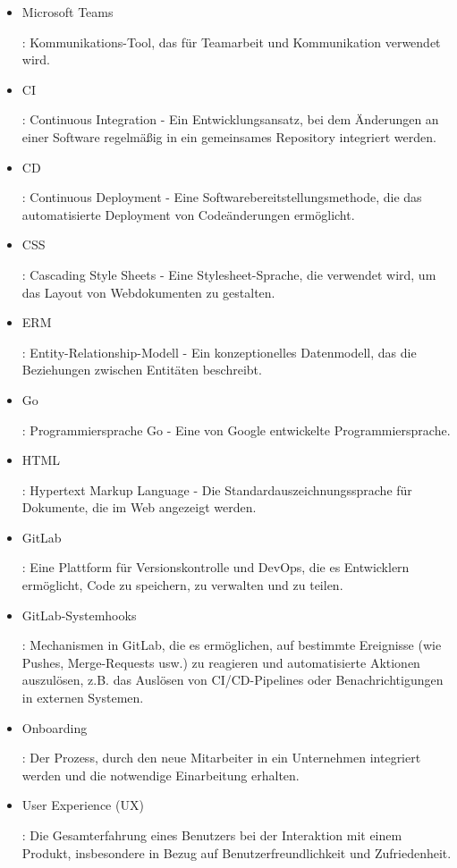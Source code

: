 

\begin{itemize}
    \item \hypertarget{MicrosoftTeams}{Microsoft Teams}: Kommunikations-Tool, das für Teamarbeit und Kommunikation verwendet wird.
    \item \hypertarget{CI}{CI}: Continuous Integration - Ein Entwicklungsansatz, bei dem Änderungen an einer Software regelmäßig in ein gemeinsames Repository integriert werden.
    \item \hypertarget{CD}{CD}: Continuous Deployment - Eine Softwarebereitstellungsmethode, die das automatisierte Deployment von Codeänderungen ermöglicht.
    \item \hypertarget{CSS}{CSS}: Cascading Style Sheets - Eine Stylesheet-Sprache, die verwendet wird, um das Layout von Webdokumenten zu gestalten.
    \item \hypertarget{ERM}{ERM}: Entity-Relationship-Modell - Ein konzeptionelles Datenmodell, das die Beziehungen zwischen Entitäten beschreibt.
    \item \hypertarget{Go}{Go}: Programmiersprache Go - Eine von Google entwickelte Programmiersprache.
    \item \hypertarget{HTML}{HTML}: Hypertext Markup Language - Die Standardauszeichnungssprache für Dokumente, die im Web angezeigt werden.
    \item \hypertarget{GitLab}{GitLab}: Eine Plattform für Versionskontrolle und DevOps, die es Entwicklern ermöglicht, Code zu speichern, zu verwalten und zu teilen.
    \item \hypertarget{GitLabSystemhooks}{GitLab-Systemhooks}: Mechanismen in GitLab, die es ermöglichen, auf bestimmte Ereignisse (wie Pushes, Merge-Requests usw.) zu reagieren und automatisierte Aktionen auszulösen, z.B. das Auslösen von CI/CD-Pipelines oder Benachrichtigungen in externen Systemen.
    \item \hypertarget{Onboarding}{Onboarding}: Der Prozess, durch den neue Mitarbeiter in ein Unternehmen integriert werden und die notwendige Einarbeitung erhalten.
    \item \hypertarget{UserExperience}{User Experience (UX)}: Die Gesamterfahrung eines Benutzers bei der Interaktion mit einem Produkt, insbesondere in Bezug auf Benutzerfreundlichkeit und Zufriedenheit.

\end{itemize}
